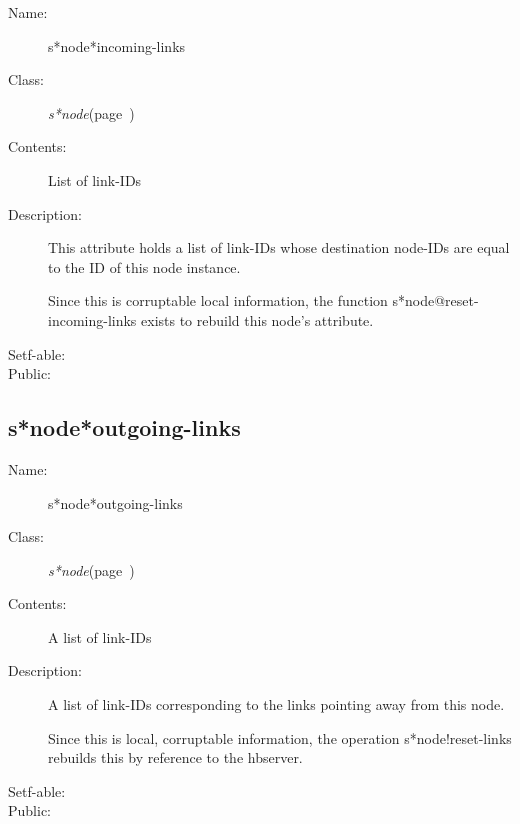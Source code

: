 \begin{description}

\item [Name:]  s*node*incoming-links

\item [Class:] {\sl s*node}\hfill(page~\pageref{s*node})

\item [Contents:] List of link-IDs

\item [Description:]
This attribute holds a list of link-IDs
whose destination node-IDs are equal 
to the ID of this node instance.

Since this is corruptable local information,
the function s*node@reset-incoming-links
exists to rebuild this node's attribute.

\item [Setf-able:]


\item [Public:]



\end{description}
\horizontalline

\subsection{s*node*outgoing-links}
\label{s*node*outgoing-links}

\begin{description}

\item [Name:]  s*node*outgoing-links

\item [Class:] {\sl s*node}\hfill(page~\pageref{s*node})
 
\item [Contents:] A list of link-IDs

\item [Description:] 
A list of link-IDs corresponding to the
links pointing away from this node.

Since this is local, corruptable information,
the operation s*node!reset-links rebuilds
this by reference to the hbserver.

\item [Setf-able:]


\item [Public:]



\end{description}
\horizontalline

